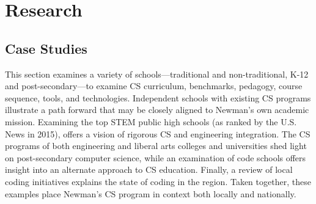 

\chapter{Research} %

\label{Chapter2} %


\section{Case Studies}
This section examines a variety of schools---traditional and non-traditional, K-12 and post-secondary---to examine CS curriculum, benchmarks, pedagogy, course sequence, tools, and technologies. Independent schools with existing CS programs illustrate a path forward that may be closely aligned to Newman's own academic mission. Examining the top STEM public high schools (as ranked by the U.S. News in 2015), offers a vision of rigorous CS and engineering integration. The CS programs of both engineering and liberal arts colleges and universities shed light on post-secondary computer science, while an examination of code schools offers insight into an alternate approach to CS education. Finally, a review of local coding initiatives explains the state of coding in the region. Taken together, these examples place Newman's CS program in context both locally and nationally.
